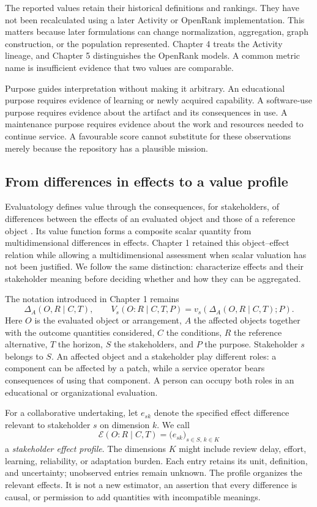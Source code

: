The reported values retain their historical definitions and rankings. They have not been recalculated using a later Activity or OpenRank implementation. This matters because later formulations can change normalization, aggregation, graph construction, or the population represented. Chapter 4 treats the Activity lineage, and Chapter 5 distinguishes the OpenRank models. A common metric name is insufficient evidence that two values are comparable.

Purpose guides interpretation without making it arbitrary. An educational purpose requires evidence of learning or newly acquired capability. A software-use purpose requires evidence about the artifact and its consequences in use. A maintenance purpose requires evidence about the work and resources needed to continue service. A favourable score cannot substitute for these observations merely because the repository has a plausible mission.

\subsection{From differences in effects to a value profile}
Evaluatology defines value through the consequences, for stakeholders, of differences between the effects of an evaluated object and those of a reference object \citep[Section 11.1]{zhan2026book}. Its value function forms a composite scalar quantity from multidimensional differences in effects. Chapter 1 retained this object--effect relation while allowing a multidimensional assessment when scalar valuation has not been justified. We follow the same distinction: characterize effects and their stakeholder meaning before deciding whether and how they can be aggregated.

The notation introduced in Chapter 1 remains
\[
\Delta_A(O,R\mid C,T),\qquad
V_s(O:R\mid C,T,P)=v_s\!\left(\Delta_A(O,R\mid C,T);P\right).
\]
Here \(O\) is the evaluated object or arrangement, \(A\) the affected objects together with the outcome quantities considered, \(C\) the conditions, \(R\) the reference alternative, \(T\) the horizon, \(S\) the stakeholders, and \(P\) the purpose. Stakeholder \(s\) belongs to \(S\). An affected object and a stakeholder play different roles: a component can be affected by a patch, while a service operator bears consequences of using that component. A person can occupy both roles in an educational or organizational evaluation.

For a collaborative undertaking, let \(e_{sk}\) denote the specified effect difference relevant to stakeholder \(s\) on dimension \(k\). We call
\begin{equation}
\mathcal E(O:R\mid C,T)=\bigl(e_{sk}\bigr)_{s\in S,\,k\in K}
\label{eq:effect-profile}
\end{equation}
a \emph{stakeholder effect profile}. The dimensions \(K\) might include review delay, effort, learning, reliability, or adaptation burden. Each entry retains its unit, definition, and uncertainty; unobserved entries remain unknown. The profile organizes the relevant effects. It is not a new estimator, an assertion that every difference is causal, or permission to add quantities with incompatible meanings.

